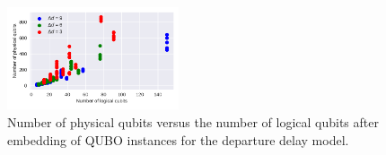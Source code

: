 \begin{figure}[htpb]
    \centering
    \includegraphics[width=0.45\textwidth]{./pics/physicalVsLogicalNumberOfQubits.pdf}
    \caption{Number of physical qubits versus the number of logical qubits after embedding of QUBO instances for the departure delay model.}
\label{fig:number_of_physical_qubits}
\end{figure}




